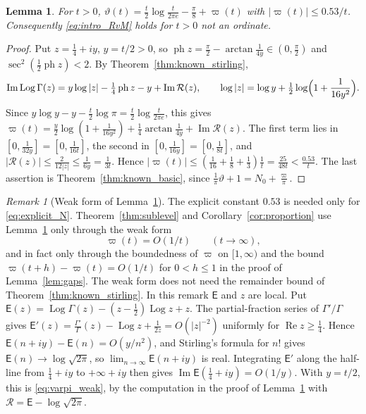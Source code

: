 \documentclass[11pt,a4paper]{article}
\makeatletter
\numberwithin{equation}{section}
\DeclareRobustCommand{\CGref}[1]{\ref{#1}}
\DeclareRobustCommand{\CGeqref}[1]{\eqref{#1}}
\let\CG@origref\ref
\let\CG@origeqref\eqref
\newcommand{\CG@gettip}[1]{\@ifundefined{CGTip@#1}{#1}{\csname CGTip@#1\endcsname}}
\DeclareRobustCommand{\CGref}[1]{\pdftooltip{\CG@origref{#1}}{\CG@gettip{#1}}}
\DeclareRobustCommand{\CGeqref}[1]{\pdftooltip{\CG@origeqref{#1}}{\CG@gettip{#1}}}
\newtheorem{lemma}[theorem]{Lemma}
\theoremstyle{definition}
\theoremstyle{remark}
\newtheorem{remark}[theorem]{Remark}
\newcommand{\Nz}{N_0} %
\makeatother
\begin{document}
\begin{lemma}\label{lem:varpi}
For $t>0$, $\vartheta(t)=\frac t2\log\frac t{2\pi e}-\frac\pi8+\varpi(t)$ with $|\varpi(t)|\le0.53/t$. Consequently \CGeqref{eq:intro_RvM} holds for $t>0$ not an ordinate.
\end{lemma}

\begin{proof}
Put $z=\frac14+iy$, $y=t/2>0$, so $\operatorname{ph}z=\frac\pi2-\arctan\frac1{4y}\in(0,\frac\pi2)$ and $\sec^2(\frac12\operatorname{ph}z)<2$. By Theorem~\CGref{thm:known_stirling},
\begin{equation}
\operatorname{Im}\operatorname{Log}\Gamma(z)=y\log|z|-\tfrac14\operatorname{ph}z-y+\operatorname{Im}\mathcal R(z),\qquad \log|z|=\log y+\tfrac12\log\Bigl(1+\frac1{16y^2}\Bigr).
\label{eq:disp_10}
\end{equation}
Since $y\log y-y-\frac t2\log\pi=\frac t2\log\frac t{2\pi e}$, this gives $\varpi(t)=\frac y2\log(1+\frac1{16y^2})+\frac14\arctan\frac1{4y}+\operatorname{Im}\mathcal R(z)$. The first term lies in $[0,\frac1{32y}]=[0,\frac1{16t}]$, the second in $[0,\frac1{16y}]=[0,\frac1{8t}]$, and $|\mathcal R(z)|\le\frac2{12|z|}\le\frac1{6y}=\frac1{3t}$. Hence $|\varpi(t)|\le(\frac1{16}+\frac18+\frac13)\frac1t=\frac{25}{48t}<\frac{0.53}t$. The last assertion is Theorem~\CGref{thm:known_basic}, since $\frac1\pi\vartheta+1=\Nz+\frac\varpi\pi$.
\end{proof}

\begin{remark}[Weak form of Lemma~\ref{lem:varpi}]\label{rem:varpi_weak}
The explicit constant $0.53$ is needed only for \CGeqref{eq:explicit_N}. Theorem~\CGref{thm:sublevel} and Corollary~\CGref{cor:proportion} use Lemma~\CGref{lem:varpi} only through the weak form
\begin{equation}
\varpi(t)=O(1/t)\qquad(t\to\infty),
\label{eq:varpi_weak}
\end{equation}
and in fact only through the boundedness of $\varpi$ on $[1,\infty)$ and the bound $\varpi(t+h)-\varpi(t)=O(1/t)$ for $0<h\le1$ in the proof of Lemma~\CGref{lem:gaps}. The weak form does not need the remainder bound of Theorem~\CGref{thm:known_stirling}. In this remark $\mathsf E$ and $z$ are local. Put $\mathsf E(z)=\operatorname{Log}\Gamma(z)-(z-\frac12)\operatorname{Log}z+z$. The partial-fraction series of $\Gamma'/\Gamma$ gives $\mathsf E'(z)=\frac{\Gamma'}\Gamma(z)-\operatorname{Log}z+\frac1{2z}=O(|z|^{-2})$ uniformly for $\operatorname{Re}z\ge\frac14$. Hence $\mathsf E(n+iy)-\mathsf E(n)=O(y/n^2)$, and Stirling's formula for $n!$ gives $\mathsf E(n)\to\log\sqrt{2\pi}$, so $\lim_{n\to\infty}\mathsf E(n+iy)$ is real. Integrating $\mathsf E'$ along the half-line from $\frac14+iy$ to $+\infty+iy$ then gives $\operatorname{Im}\mathsf E(\frac14+iy)=O(1/y)$. With $y=t/2$, this is \CGeqref{eq:varpi_weak}, by the computation in the proof of Lemma~\CGref{lem:varpi} with $\mathcal R=\mathsf E-\log\sqrt{2\pi}$.
\end{remark}
\end{document}
